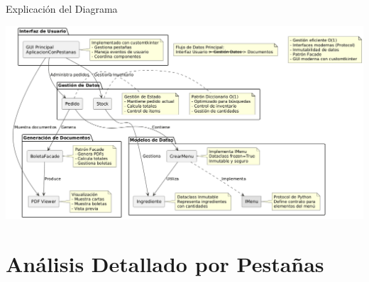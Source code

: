 \documentclass[12pt]{beamer}
\begin{document}
\begin{frame}{Explicación del Diagrama}
  \begin{center}
    \includegraphics[width=\linewidth, height=0.8\textheight, keepaspectratio]{images/explicacion_diagrama.png}
  \end{center}
\end{frame}

\section{Análisis Detallado por Pestañas}
\end{document}
